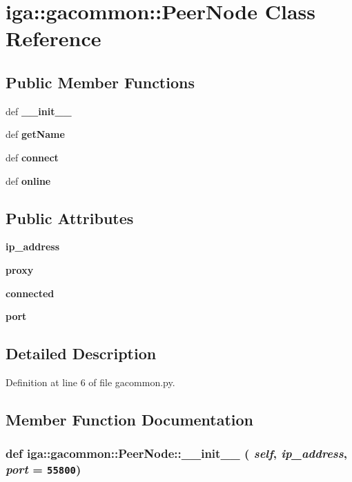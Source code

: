 \section{iga::gacommon::PeerNode Class Reference}
\label{classiga_1_1gacommon_1_1PeerNode}
\subsection*{Public Member Functions}
\begin{CompactItemize}
\item 
def {\bf \_\-\_\-init\_\-\_\-}
\item 
def {\bf getName}
\item 
def {\bf connect}
\item 
def {\bf online}
\end{CompactItemize}
\subsection*{Public Attributes}
\begin{CompactItemize}
\item 
{\bf ip\_\-address}
\item 
{\bf proxy}
\item 
{\bf connected}
\item 
{\bf port}
\end{CompactItemize}


\subsection{Detailed Description}


Definition at line 6 of file gacommon.py.

\subsection{Member Function Documentation}
\subsubsection{\setlength{\rightskip}{0pt plus 5cm}def iga::gacommon::PeerNode::\_\-\_\-init\_\-\_\- ( {\em self},  {\em ip\_\-address},  {\em port} = {\tt 55800})}\label{classiga_1_1gacommon_1_1PeerNode_70451e3f0384bbcd49adc232abee26a7}




